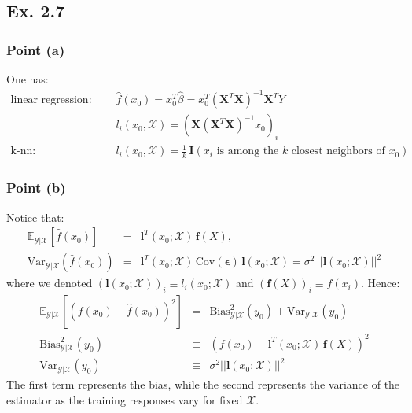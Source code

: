 \subsection*{Ex. 2.7}

\subsubsection*{Point (a)}

One has:
\begin{eqnarray*}
\textrm{linear regression:} \quad && \hat{f}(x_0) = x_0^T \hat{\beta} = x_0^T (\mathbf{X} ^{T} \mathbf{X}) ^{-1} \mathbf{X} ^{T} Y \\
     && l_i(x_0, \mathcal{X}) = \left( \mathbf{X} (\mathbf{X} ^{T}\mathbf{X}) ^{-1} x_0\right)_i \\
\textrm{k-nn:} \quad && l_i(x_0, \mathcal{X}) = \frac{1}{k}\, \mathbf{I} \left( x_i \textrm{ is among the } k \textrm{ closest neighbors of } x_0 \right)
\end{eqnarray*}

\subsubsection*{Point (b)}

Notice that:
\begin{eqnarray*}
\mathbb{E}_{\mathcal{Y}|\mathcal{X}} \left[ \hat{f}(x_0) \right] & = & \bm{l}^{T}(x_0; \mathcal{X})\,\bm{f}(X),\\
\textrm{Var}_{\mathcal{Y}|\mathcal{X}}\left( \hat{f}(x_0) \right) & = & \bm{l}^{T}(x_0; \mathcal{X})\, \textrm{Cov}(\bm{\epsilon}) \, \bm{l}(x_0; \mathcal{X}) = \sigma^2 \, ||\bm{l}(x_0; \mathcal{X})||^2
\end{eqnarray*}
where we denoted $(\bm{l}(x_0; \mathcal{X}))_i \equiv l_i(x_0; \mathcal{X})$ and $(\bm{f}(X))_i \equiv f(x_i)$. Hence:
\begin{eqnarray*}
\mathbb{E}_{\mathcal{Y}| \mathcal{X}} \left[ \left( f(x_0) - \hat{f}(x_0) \right)^2 \right]  & = & \textrm{Bias}^2_{\mathcal{Y}| \mathcal{X}}(y_0) + \textrm{Var}_{\mathcal{Y}| \mathcal{X}}(y_0)\\ 
\textrm{Bias}^2_{\mathcal{Y}| \mathcal{X}}(y_0) & \equiv & \left( f(x_0) - \bm{l}^{T}(x_0; \mathcal{X})\,\bm{f}(X) \right)^2\\
\textrm{Var}_{\mathcal{Y}| \mathcal{X}}(y_0) & \equiv & \sigma^2 ||\bm{l}(x_0; \mathcal{X})||^2 
\end{eqnarray*}
The first term represents the bias, while the second represents the variance of the estimator as the training responses vary for fixed $\mathcal{X}$.

